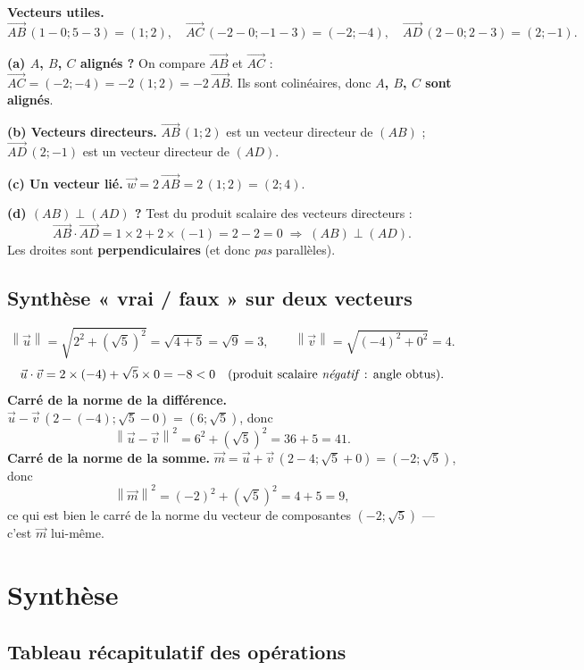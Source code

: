 \documentclass[11pt,a4paper]{article}
\newcommand{\vc}[1]{\overrightarrow{#1}}        %
\providecommand{\norm}[1]{\left\lVert #1\right\rVert}
\begin{document}
\begin{exemple}
\textbf{Vecteurs utiles.}
\[
  \vc{AB}\,(1-0;5-3)=(1;2),\quad
  \vc{AC}\,(-2-0;-1-3)=(-2;-4),\quad
  \vc{AD}\,(2-0;2-3)=(2;-1).
\]

\textbf{(a) $A$, $B$, $C$ alignés ?} On compare $\vc{AB}$ et $\vc{AC}$ : $\vc{AC}=(-2;-4)=-2\,(1;2)=-2\,\vc{AB}$.
Ils sont colinéaires, donc \textbf{$A$, $B$, $C$ sont alignés}.

\textbf{(b) Vecteurs directeurs.} $\vc{AB}\,(1;2)$ est un vecteur directeur de $(AB)$ ;
$\vc{AD}\,(2;-1)$ est un vecteur directeur de $(AD)$.

\textbf{(c) Un vecteur lié.} $\vec w=2\,\vc{AB}=2\,(1;2)=(2;4)$.

\textbf{(d) $(AB)\perp(AD)$ ?} Test du produit scalaire des vecteurs directeurs :
\[
  \vc{AB}\cdot\vc{AD}=1\times2+2\times(-1)=2-2=0\;\Rightarrow\;(AB)\perp(AD).
\]
Les droites sont \textbf{perpendiculaires} (et donc \emph{pas} parallèles).
\end{exemple}

\subsection{Synthèse « vrai / faux » sur deux vecteurs}

\begin{exemple}
\[
  \norm{\vec u}=\sqrt{2^2+(\sqrt5)^2}=\sqrt{4+5}=\sqrt9=3,\qquad
  \norm{\vec v}=\sqrt{(-4)^2+0^2}=4.
\]
\[
  \vec u\cdot\vec v=2\times(-4)+\sqrt5\times0=-8<0 \quad(\text{produit scalaire \emph{négatif} : angle obtus}).
\]
\textbf{Carré de la norme de la différence.} $\vec u-\vec v\,(2-(-4);\sqrt5-0)=(6;\sqrt5)$, donc
\[
  \norm{\vec u-\vec v}^2=6^2+(\sqrt5)^2=36+5=41.
\]
\textbf{Carré de la norme de la somme.} $\vec m=\vec u+\vec v\,(2-4;\sqrt5+0)=(-2;\sqrt5)$, donc
\[
  \norm{\vec m}^2=(-2)^2+(\sqrt5)^2=4+5=9,
\]
ce qui est bien le carré de la norme du vecteur de composantes $(-2;\sqrt5)$ — c'est $\vec m$ lui-même.
\end{exemple}

\section{Synthèse}

\subsection{Tableau récapitulatif des opérations}
\end{document}
